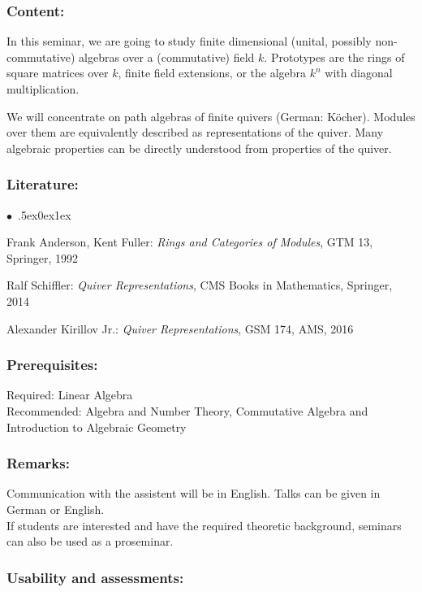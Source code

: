 \documentclass[a4paper,10pt]{article}
\renewenvironment{itemize}{\begin{list}{$\bullet$\ }{\itemsep.5ex\setlength{\topsep}{0.5\itemsep}\parsep0ex\labelsep1ex\settowidth{\labelwidth}{$\bullet$\ }\setlength{\leftmargin}{\labelwidth}\addtolength{\leftmargin}{3ex}\addtolength{\leftmargin}{\labelsep}}}{\end{list}}
\begin{document}
\subsubsection*{\large
    Content:
}
In this seminar, we are going to study finite dimensional (unital, possibly non-commutative) algebras over a (commutative) field $k$. Prototypes are the rings of square matrices over $k$, finite field extensions, or the algebra $k^n$ with diagonal multiplication. 

We will concentrate on path algebras of finite quivers (German: Köcher). Modules over them are equivalently described as representations of the quiver. Many algebraic properties can be directly understood from properties of the quiver. 
\subsubsection*{\large
    Literature:
}
\begin{itemize}
\item
Frank Anderson, Kent Fuller: \emph{Rings and Categories of Modules}, GTM 13, Springer, 1992 
\item
Ralf Schiffler: \emph{Quiver Representations}, CMS Books in Mathematics, Springer, 2014 
\item
Alexander Kirillov Jr.: \emph{Quiver Representations}, GSM 174, AMS, 2016
\end{itemize}
\subsubsection*{\large
    Prerequisites:
}
Required: Linear Algebra \\ Recommended: Algebra and Number Theory, Commutative Algebra and Introduction to Algebraic Geometry
\subsubsection*{\large
    Remarks:
}
Communication with the assistent will be in English. Talks can be given in German or English.\\
If students are interested and have the required theoretic background, seminars can also be used as a proseminar. \\
\subsubsection*{\large
    Usability and assessments:
}
\end{document}
